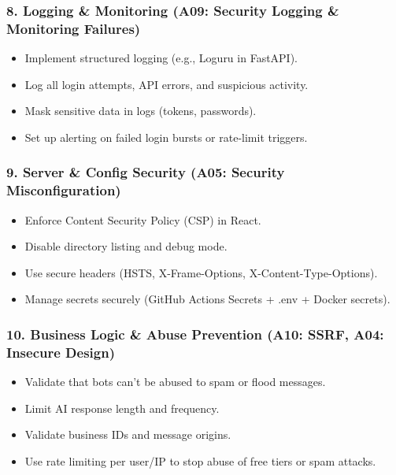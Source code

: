 \documentclass[12pt,a4paper]{article}
\begin{document}
\subsubsection{8. Logging \& Monitoring (A09: Security Logging \& Monitoring Failures)}
\begin{itemize}
    \item Implement structured logging (e.g., Loguru in FastAPI).
    \item Log all login attempts, API errors, and suspicious activity.
    \item Mask sensitive data in logs (tokens, passwords).
    \item Set up alerting on failed login bursts or rate-limit triggers.
\end{itemize}

\subsubsection{9. Server \& Config Security (A05: Security Misconfiguration)}
\begin{itemize}
    \item Enforce Content Security Policy (CSP) in React.
    \item Disable directory listing and debug mode.
    \item Use secure headers (HSTS, X-Frame-Options, X-Content-Type-Options).
    \item Manage secrets securely (GitHub Actions Secrets + .env + Docker secrets).
\end{itemize}

\subsubsection{10. Business Logic \& Abuse Prevention (A10: SSRF, A04: Insecure Design)}
\begin{itemize}
    \item Validate that bots can’t be abused to spam or flood messages.
    \item Limit AI response length and frequency.
    \item Validate business IDs and message origins.
    \item Use rate limiting per user/IP to stop abuse of free tiers or spam attacks.
\end{itemize}
\end{document}
